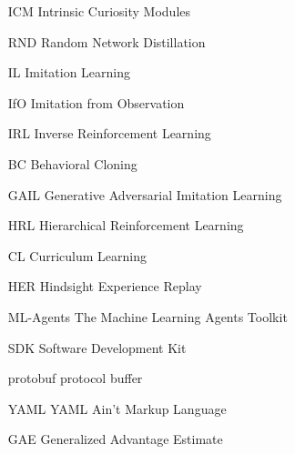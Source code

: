 \begin{itemize}
\item [ICM] Intrinsic Curiosity Modules
\item [RND] Random Network Distillation
\item [IL] Imitation Learning
\item [IfO] Imitation from Observation
\item [IRL] Inverse Reinforcement Learning
\item [BC] Behavioral Cloning
\item [GAIL] Generative Adversarial Imitation Learning
\item [HRL] Hierarchical Reinforcement Learning
\item [CL] Curriculum Learning
\item [HER] Hindsight Experience Replay
\item [ML-Agents] The Machine Learning Agents Toolkit
\item [SDK] Software Development Kit 
\item [protobuf] protocol buffer 
\item [YAML] YAML Ain't Markup Language
\item [GAE] Generalized Advantage Estimate
\end{itemize}